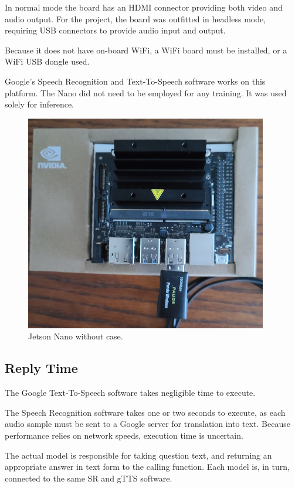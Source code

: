 In normal mode the board has an HDMI connector providing both video and audio output. For the project, the board was outfitted in headless mode, %
requiring USB connectors to provide audio input and output.

Because it does not have on-board WiFi, a WiFi board must be installed, or a WiFi USB dongle used.

Google's Speech Recognition and Text-To-Speech software works on this platform. The Nano did not need to be employed for any training. It was used solely for inference.

\begin{figure}[H]
	\begin{center}
		\includegraphics[scale=0.9]{diagram-jetson-nano-02}
		
		
	\end{center}
	\caption[Jetson Nano]{Jetson Nano without case.}
	
	
\end{figure}

\subsection{Reply Time}

The Google Text-To-Speech software takes negligible time to execute.

The Speech Recognition software takes one or two seconds to execute, as each audio sample must be sent to a Google server for translation into text. Because performance relies on network speeds, execution time is uncertain.

The actual model is responsible for taking question text, and returning an appropriate answer in text form to the calling function. Each model is, in turn, connected to the same SR and gTTS software.

